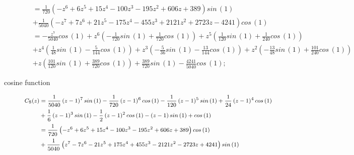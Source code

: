 \begin{description}
\begin{displaymath}
\begin{split}
                             &= \frac{1}{720} \left(- z^{6} + 6 z^{5} + 15 z^{4} - 100 z^{3} - 195 z^{2} + 606 z + 389\right) sin\,{\left (1 \right )} \\
                             &+ \frac{1}{5040} \left(- z^{7} + 7 z^{6} + 21 z^{5} - 175 z^{4} - 455 z^{3} + 2121 z^{2} + 2723 z - 4241\right) cos\,{\left (1 \right )} \\
                             &= - \frac{z^{7}}{5040} cos\,{\left (1 \right )} + z^{6} \left(- \frac{1}{720} sin\,{\left (1 \right )} + \frac{1}{720} cos\,{\left (1 \right )}\right) + z^{5} \left(\frac{1}{120} sin\,{\left (1 \right )} + \frac{1}{240} cos\,{\left (1 \right )}\right) \\
                             &+ z^{4} \left(\frac{1}{48} sin\,{\left (1 \right )} - \frac{5}{144} cos\,{\left (1 \right )}\right) + z^{3} \left(- \frac{5}{36} sin\,{\left (1 \right )} - \frac{13}{144} cos\,{\left (1 \right )}\right) + z^{2} \left(- \frac{13}{48} sin\,{\left (1 \right )} + \frac{101}{240} cos\,{\left (1 \right )}\right) \\
                             &+ z \left(\frac{101}{120} sin\,{\left (1 \right )} + \frac{389}{720} cos\,{\left (1 \right )}\right) + \frac{389}{720} sin\,{\left (1 \right )} - \frac{4241}{5040} cos\,{\left (1 \right )};
    \end{split}
\end{displaymath}
\item[cosine function]
\begin{displaymath}
    \footnotesize
    \begin{split}
        C_{8}{\left (z \right )} &= \frac{1}{5040} \left(z - 1\right)^{7} sin\,{\left (1 \right )} - \frac{1}{720} \left(z - 1\right)^{6} cos\,{\left (1 \right )} - \frac{1}{120} \left(z - 1\right)^{5} sin\,{\left (1 \right )} + \frac{1}{24} \left(z - 1\right)^{4} cos\,{\left (1 \right )} \\ &+ \frac{1}{6} \left(z - 1\right)^{3} sin\,{\left (1 \right )} - \frac{1}{2} \left(z - 1\right)^{2} cos\,{\left (1 \right )} - \left(z - 1\right) sin\,{\left (1 \right )} + cos\,{\left (1 \right )} \\
                             &= \frac{1}{720} \left(- z^{6} + 6 z^{5} + 15 z^{4} - 100 z^{3} - 195 z^{2} + 606 z + 389\right) cos\,{\left (1 \right )} \\
                             &+ \frac{1}{5040} \left(z^{7} - 7 z^{6} - 21 z^{5} + 175 z^{4} + 455 z^{3} - 2121 z^{2} - 2723 z + 4241\right) sin\,{\left (1 \right )}\\

\end{split}
\end{displaymath}
\end{description}

